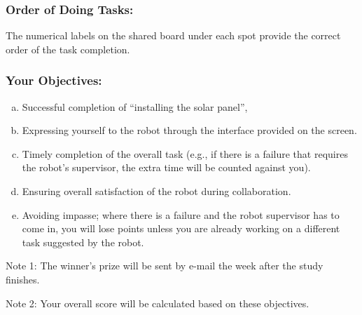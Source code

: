 \documentclass[12pt]{report}
\begin{document}
\begin{appendices}
\subsubsection{Order of Doing Tasks:}
The numerical labels on the shared board under each spot provide the correct
order of the task completion.

\subsubsection{Your Objectives:}

\begin{enumerate}[a)]
  \setlength\itemsep{-3mm}
  \item Successful completion of “installing the solar panel”,
  \item Expressing yourself to the robot through the interface provided on the
  screen.
  \item Timely completion of the overall task (e.g., if there is a failure that
  requires the robot's supervisor, the extra time will be counted against you).
  \item Ensuring overall satisfaction of the robot during collaboration.
  \item Avoiding impasse; where there is a failure and the robot supervisor has
  to come in, you will lose points unless you are already working on a different
  task suggested by the robot.
\end{enumerate}

Note 1: The winner's prize will be sent by e-mail the week after the study finishes.

Note 2: Your overall score will be calculated based on these objectives.

\pagebreak


\end{appendices}
\end{document}
